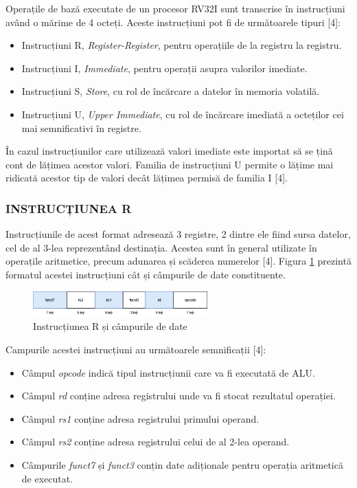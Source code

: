 \documentclass[12pt]{article}
\begin{document}
Operațile de bază executate de un procesor RV32I sunt transcrise în instrucțiuni având o mărime de 4 octeți. Aceste instrucțiuni pot fi de următoarele tipuri [4]:

\begin{itemize}
\item Instrucțiuni R, \textit{Register-Register}, pentru operațiile de la registru la registru.
\item Instrucțiuni I, \textit{Immediate}, pentru operații asupra valorilor imediate.
\item Instrucțiuni S, \textit{Store}, cu rol de încărcare a datelor în memoria volatilă.
\item Instrucțiuni U, \textit{Upper Immediate}, cu rol de încărcare imediată a octeților cei mai semnificativi în registre.
\end{itemize}

În cazul instrucțiunilor care utilizează valori imediate este importat să se țină cont de lățimea acestor valori. Familia de instrucțiuni U permite o lățime mai ridicată acestor tip de valori decât lățimea permisă de familia I [4].

\subsubsection{INSTRUCȚIUNEA R}
Instrucțiunile de acest format adresează 3 registre, 2 dintre ele fiind sursa datelor, cel de al 3-lea reprezentând destinația. Acestea sunt în general utilizate în operațile aritmetice, precum adunarea și scăderea numerelor [4]. Figura \ref{Figura:10} prezintă formatul acestei instrucțiuni cât și câmpurile de date constituente.



 \begin{figure}[h!]
 \includegraphics[width=0.6\textwidth]{rtype.drawio.png}
 \centering
 \caption{Instrucțiunea R și câmpurile de date}
 \label{Figura:10}
 \end{figure}

 Campurile acestei instrucțiuni au următoarele semnificații [4]:
 \begin{itemize}
\item Câmpul \textit{opcode} indică tipul instrucțiunii care va fi executată de ALU.
\item Câmpul \textit{rd} conține adresa registrului unde va fi stocat rezultatul operației.
\item Câmpul \textit{rs1} conține adresa registrului primului operand.
\item Câmpul \textit{rs2} conține adresa registrului celui de al 2-lea operand.
\item Câmpurile \textit{funct7} și \textit{funct3} conțin date adiționale pentru operația aritmetică de executat.
\end{itemize}
\end{document}
